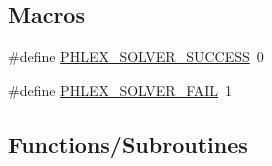 \subsection*{Macros}
\begin{DoxyCompactItemize}
\item 
\#define \mbox{\hyperlink{phlex__solver__data_8_f90_a504e84af799d6e4ff71fa8b1341e7877}{P\+H\+L\+E\+X\+\_\+\+S\+O\+L\+V\+E\+R\+\_\+\+S\+U\+C\+C\+E\+SS}}~0
\item 
\#define \mbox{\hyperlink{phlex__solver__data_8_f90_aa90cec80f230c1a11fc606e231e6bac4}{P\+H\+L\+E\+X\+\_\+\+S\+O\+L\+V\+E\+R\+\_\+\+F\+A\+IL}}~1
\end{DoxyCompactItemize}
\subsection*{Functions/\+Subroutines}
